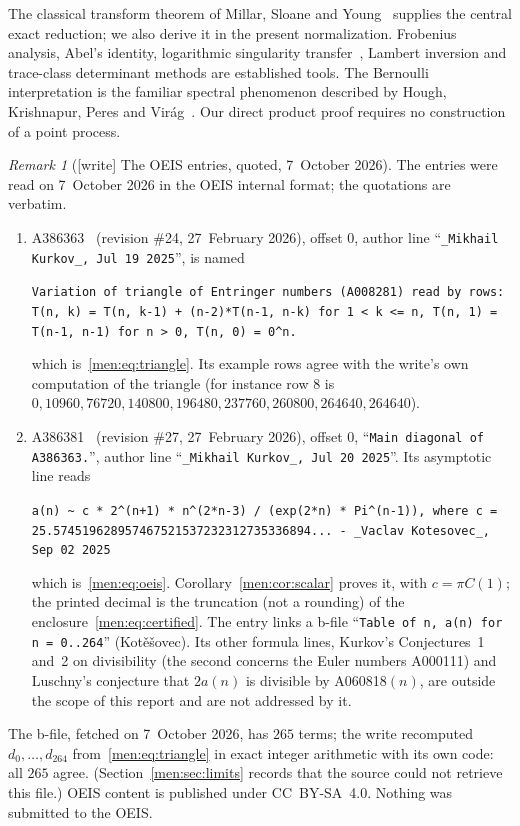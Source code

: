 \documentclass[11pt,letterpaper]{article}
\theoremstyle{remark}\newtheorem{remark}[theorem]{Remark}
\begin{document}
The classical transform theorem of Millar, Sloane and Young~\cite{msy} supplies the central exact reduction; we also derive it in the present normalization. Frobenius analysis, Abel's identity, logarithmic singularity transfer~\cite{fo,fs}, Lambert inversion and trace-class determinant methods are established tools. The Bernoulli interpretation is the familiar spectral phenomenon described by Hough, Krishnapur, Peres and Vir\'ag~\cite{hkpv}. Our direct product proof requires no construction of a point process.

\begin{remark}[{[write]} The OEIS entries, quoted, 7~October 2026]\label{men:rem:oeis}
The entries were read on 7~October 2026 in the OEIS internal format; the
quotations are verbatim.
\begin{enumerate}[label=(\alph*)]\raggedright
\item A386363~\cite{triangle} (revision \#24, 27~February 2026), offset
 $0$, author line ``\texttt{\_Mikhail Kurkov\_, Jul 19 2025}'', is named
 \begin{center}\small
 \parbox{0.92\textwidth}{\raggedright\texttt{Variation of triangle of Entringer numbers (A008281) read by rows: T(n, k) = T(n, k-1) + (n-2)*T(n-1, n-k) for 1 < k <= n, T(n, 1) = T(n-1, n-1) for n > 0, T(n, 0) = 0\^{}n.}}
 \end{center}
 which is~\eqref{men:eq:triangle}. Its example rows agree with the write's
 own computation of the triangle (for instance row $8$ is
 $0, 10960, 76720, 140800, 196480, 237760, 260800, 264640, 264640$).
\item A386381~\cite{diagonal} (revision \#27, 27~February 2026), offset
 $0$, ``\texttt{Main diagonal of A386363.}'', author line
 ``\texttt{\_Mikhail Kurkov\_, Jul 20 2025}''. Its asymptotic line reads
 \begin{center}\small
 \parbox{0.92\textwidth}{\raggedright\texttt{a(n) \textasciitilde{} c * 2\^{}(n+1) * n\^{}(2*n-3) / (exp(2*n) * Pi\^{}(n-1)), where c = 25.574519628957467521537232312735336894... - \_Vaclav Kotesovec\_, Sep 02 2025}}
 \end{center}
 which is~\eqref{men:eq:oeis}. Corollary~\ref{men:cor:scalar} proves it,
 with $c=\pi C(1)$; the printed decimal is the truncation (not a rounding)
 of the enclosure~\eqref{men:eq:certified}. The entry links a b-file
 ``\texttt{Table of n, a(n) for n = 0..264}'' (Kot\v{e}\v{s}ovec).
 Its other formula lines, Kurkov's Conjectures~1 and~2 on divisibility
 (the second concerns the Euler numbers A000111) and Luschny's conjecture
 that $2a(n)$ is divisible by A060818$(n)$, are outside the scope of this
 report and are not addressed by it.
\end{enumerate}
The b-file, fetched on 7~October 2026, has $265$ terms; the write
recomputed $d_0,\dots,d_{264}$ from~\eqref{men:eq:triangle} in exact
integer arithmetic with its own code: all $265$ agree. (Section~\ref{men:sec:limits}
records that the source could not retrieve this file.) OEIS content is
published under CC~BY-SA~4.0. Nothing was submitted to the OEIS.
\end{remark}
\end{document}
